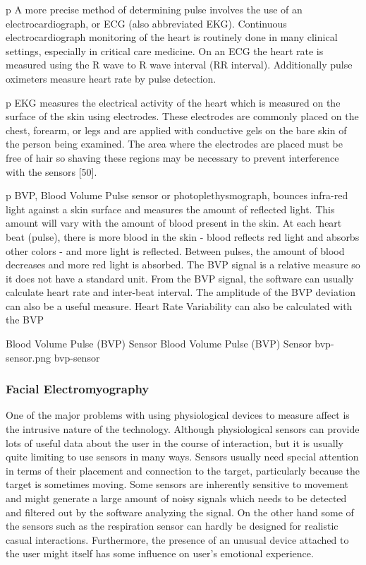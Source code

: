 \documentclass{uofsthesis-cs}
\begin{document}
p A more precise method of determining pulse involves the use of an electrocardiograph, or ECG (also abbreviated EKG). Continuous electrocardiograph monitoring of the heart is routinely done in many clinical settings, especially in critical care medicine. On an ECG the heart rate is measured using the R wave to R wave interval (RR interval). Additionally pulse oximeters measure heart rate by pulse detection.

p EKG measures the electrical activity of the heart which is measured on the surface of the skin using electrodes. These electrodes are commonly placed on the chest, forearm, or legs and are applied with conductive gels on the bare skin of the person being examined. The area where the electrodes are placed must be free of hair so shaving these regions may be necessary to prevent interference with the sensors [50].

p BVP, Blood Volume Pulse sensor or photoplethysmograph, bounces infra-red light against a skin surface and measures the amount of reflected light. This amount will vary with the amount of blood present in the skin. At each heart beat (pulse), there is more blood in the skin - blood reflects red light and absorbs other colors - and more light is reflected. Between pulses, the amount of blood decreases and more red light is absorbed. The BVP signal is a relative measure so it does not have a standard unit. From the BVP signal, the software can usually calculate heart rate and inter-beat interval. The amplitude of the BVP deviation can also be a useful measure. Heart Rate Variability can also be calculated with the BVP

\img
{Blood Volume Pulse (BVP) Sensor}
{Blood Volume Pulse (BVP) Sensor}
{bvp-sensor.png}
{bvp-sensor}


\subsubsection{Facial Electromyography}


One of the major problems with using physiological devices to measure affect is the intrusive nature of the technology. Although physiological sensors can provide lots of useful data about the user in the course of interaction, but  it is usually quite limiting to use sensors in many ways. Sensors usually need special attention in terms of their placement and connection to the target, particularly because the target is sometimes moving. Some sensors are inherently sensitive to movement and might generate a large amount of noisy signals which needs to be detected and filtered out by the software analyzing the signal. On the other hand some of the sensors such as the respiration sensor can hardly be designed for realistic casual interactions. Furthermore, the presence of an unusual device attached to the user might itself has some influence on user's emotional experience.
\end{document}
